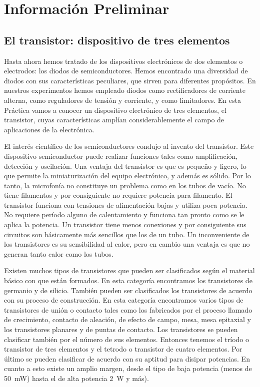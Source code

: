 \documentclass[a4paper,12pt]{article}
\begin{document}
\section{Información Preliminar}

\subsection{El transistor: dispositivo de tres elementos}

Hasta ahora hemos tratado de los dispositivos electrónicos de dos elementos o electrodos: los diodos
de semiconductores. Hemos encontrado una diversidad de diodos con sus características
peculiares, que sirven para diferentes propósitos. En nuestros experimentos hemos empleado diodos como
rectificadores de corriente alterna, como reguladores de tensión y corriente, y como limitadores. En esta
Práctica vamos a conocer un dispositivo electrónico de tres elementos, el transistor, cuyas características
amplían considerablemente el campo de aplicaciones de la electrónica.

El interés científico de los semiconductores condujo al invento del transistor. Este dispositivo
semiconductor puede realizar funciones tales como amplificación, detección y oscilación. Una ventaja
del transistor es que es pequeño y ligero, lo que permite la miniaturización del equipo electrónico,
y además es sólido. Por lo tanto, la microfonía no constituye un problema como en los tubos de vacío.
No tiene filamentos y por consiguiente no requiere potencia para filamento. El transistor funciona con
tensiones de alimentación bajas y utiliza poca potencia. No requiere período alguno de calentamiento y
funciona tan pronto como se le aplica la potencia. Un transistor tiene menos conexiones y por consiguiente
sus circuitos son básicamente más sencillos que los de un tubo. Un inconveniente de los transistores es
su sensibilidad al calor, pero en cambio una ventaja es que no generan tanto calor como los tubos.

Existen muchos tipos de transistores que pueden ser clasificados según el material básico con que están
formados. En esta categoría encontramos los transistores de germanio y de silicio. También pueden ser
clasificados los transistores de acuerdo con su proceso de construcción. En esta categoría encontramos
varios tipos de transistores de unión o contacto tales como los fabricados por el proceso llamado de
crecimiento, contacto de aleación, de efecto de campo, mesa, mesa epitaxial y los transistores planares
y de puntas de contacto. Los transistores se pueden clasificar también por el número de sus elementos.
Entonces tenemos el tríodo o transistor de tres elementos y el tetrodo o transistor de cuatro elementos.
Por último se pueden clasificar de acuerdo con su aptitud para disipar potencias. En cuanto a esto existe
un amplio margen, desde el tipo de baja potencia (menos de \SI{50}{\milli\watt}) hasta el de alta potencia
\SI{2}{\watt} y más).
\end{document}

